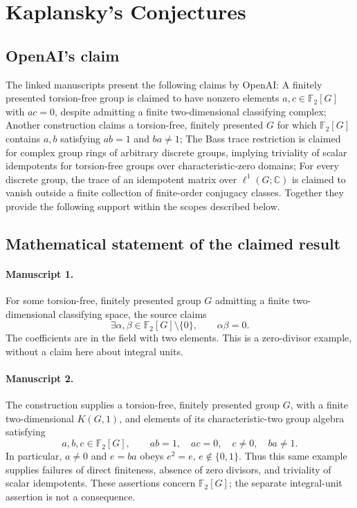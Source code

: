 \documentclass[11pt]{article}
\begin{document}
\section*{Kaplansky's Conjectures}

\subsection{OpenAI's claim}
The linked manuscripts present the following claims by OpenAI: A finitely presented torsion-free group is claimed to have nonzero elements $a,c\in\mathbb F_2[G]$ with $ac=0$, despite admitting a finite two-dimensional classifying complex; Another construction claims a torsion-free, finitely presented $G$ for which $\mathbb F_2[G]$ contains $a,b$ satisfying $ab=1$ and $ba\ne1$; The Bass trace restriction is claimed for complex group rings of arbitrary discrete groups, implying triviality of scalar idempotents for torsion-free groups over characteristic-zero domains; For every discrete group, the trace of an idempotent matrix over $\ell^1(G;\mathbb C)$ is claimed to vanish outside a finite collection of finite-order conjugacy classes. Together they provide the following support within the scopes described below.

\subsection{Mathematical statement of the claimed result}
\paragraph{Manuscript 1.}
For some torsion-free, finitely presented group \(G\) admitting a finite two-dimensional classifying space, the source claims
\[
 \exists\alpha,\beta\in\mathbb F_2[G]\setminus\{0\},\qquad\alpha\beta=0.
\]
The coefficients are in the field with two elements. This is a zero-divisor example, without a claim here about integral units.

\paragraph{Manuscript 2.}
The construction supplies a torsion-free, finitely presented group \(G\), with a finite two-dimensional \(K(G,1)\), and elements of its characteristic-two group algebra satisfying
\[
 a,b,c\in\mathbb F_2[G],\qquad ab=1,\quad ac=0,\quad c\ne0,\quad ba\ne1.
\]
In particular, \(a\ne0\) and \(e=ba\) obeys \(e^2=e\), \(e\notin\{0,1\}\). Thus this same example supplies failures of direct finiteness, absence of zero divisors, and triviality of scalar idempotents. These assertions concern \(\mathbb F_2[G]\); the separate integral-unit assertion is not a consequence.
\end{document}
